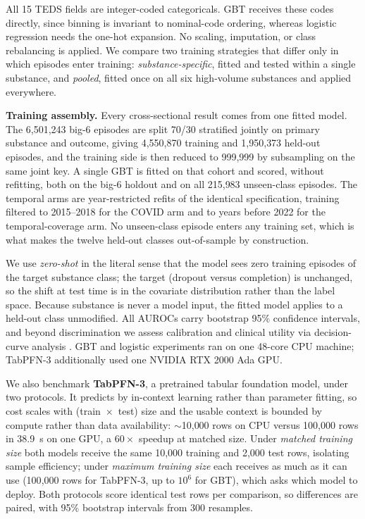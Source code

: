 \documentclass[conference]{IEEEtran}
\begin{document}
All 15 TEDS fields are integer-coded categoricals. GBT receives these codes directly, since binning is
invariant to nominal-code ordering, whereas logistic regression needs the one-hot expansion. No scaling, imputation, or class rebalancing is applied.
We compare two training strategies that differ only in which episodes enter training:
\emph{substance-specific}, fitted and tested within a single substance, and \emph{pooled},
fitted once on all six high-volume substances and applied everywhere.

\textbf{Training assembly.} Every cross-sectional result comes from one fitted model. The
6{,}501{,}243 big-6 episodes are split 70/30 stratified jointly on primary substance and outcome,
giving 4{,}550{,}870 training and 1{,}950{,}373 held-out episodes, and the training side is then
reduced to 999{,}999 by subsampling on the same joint key. A single GBT is fitted on that
cohort and scored, without refitting, both on the big-6 holdout and on all 215{,}983 unseen-class
episodes. The temporal arms are year-restricted refits of the identical specification, training
filtered to 2015--2018 for the COVID arm and to years before 2022 for the temporal-coverage arm.
No unseen-class episode enters any training set, which is what makes the twelve held-out classes
out-of-sample by construction.

We use \emph{zero-shot} in the literal sense that the model sees zero training episodes of
the target substance class; the target (dropout versus completion) is unchanged, so the shift
at test time is in the covariate distribution rather than the label space. Because substance
is never a model input, the fitted model applies to a held-out class unmodified. All AUROCs carry bootstrap 95\% confidence intervals, and beyond discrimination we assess
calibration \cite{van_calster_calib} and clinical utility via decision-curve analysis
\cite{dca_vickers}. GBT and logistic experiments ran on one 48-core CPU machine; TabPFN-3
additionally used one NVIDIA RTX 2000 Ada GPU.


We also benchmark \textbf{TabPFN-3}, a pretrained tabular foundation model, under two
protocols. It predicts by in-context learning rather than parameter fitting, so cost scales with
(train~$\times$~test) size and the usable context is bounded by compute rather than data
availability: $\sim$10{,}000 rows on CPU versus 100{,}000 rows in 38.9~s on one GPU, a $60\times$ speedup at
matched size. Under \emph{matched training size} both
models receive the same 10{,}000 training and 2{,}000 test rows, isolating sample efficiency;
under \emph{maximum training size} each receives as much as it can use (100{,}000 rows for
TabPFN-3, up to $10^6$ for GBT), which asks which model to deploy. Both protocols score
identical test rows per comparison, so differences are paired, with 95\% bootstrap intervals
from 300 resamples.
\end{document}

